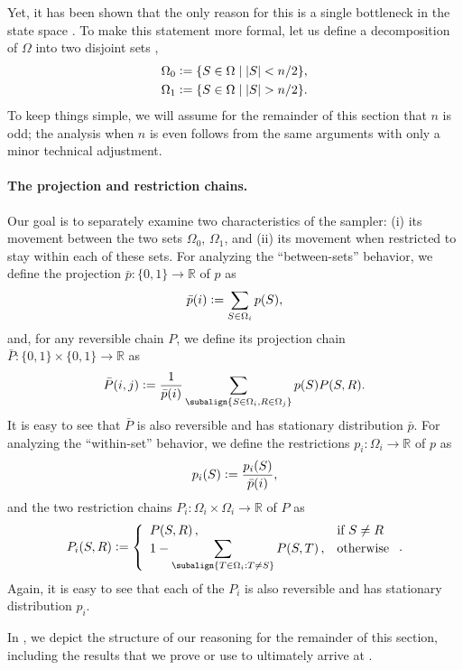 Yet, it has been shown that the only reason for this is a single bottleneck in the state space \citep{levin08}.
To make this statement more formal, let us define a decomposition of $\Omega$ into two disjoint sets \citep{jerrum04poincare},
\begin{align*}
\Omega_0 &\vcentcolon= \{S \in \Omega \mid |S| < n/2\},\\
\Omega_1 &\vcentcolon= \{S \in \Omega \mid |S| > n/2\}.
\end{align*}
To keep things simple, we will assume for the remainder of this section that $n$ is odd; the analysis when $n$ is even follows from the same arguments with only a minor technical adjustment.

\paragraph{The projection and restriction chains.}
Our goal is to separately examine two characteristics of the sampler: (i) its movement between the two sets $\Omega_0$, $\Omega_1$, and (ii) its movement when restricted to stay within each of these sets.
For analyzing the ``between-sets'' behavior, we define the projection $\bar{p} : \{0, 1\} \to \mathbb{R}$ of $p$ as
\begin{align*}
  \bar{p}(i) \vcentcolon= \sum_{S \in \Omega_i} p(S),
\end{align*}
and, for any reversible chain $P$, we define its projection chain $\bar{P} : \{0, 1\} \times \{0, 1\} \to \mathbb{R}$ as
\begin{align*}
  \bar{P}(i, j) \defeq \frac{1}{\bar{p}(i)} \sum_{\subalign{S \in \Omega_i, R \in \Omega_j}} p(S) P(S, R).
\end{align*}
It is easy to see that $\bar{P}$ is also reversible and has stationary distribution $\bar{p}$. For analyzing the ``within-set'' behavior, we define the restrictions $p_i : \Omega_i \to \mathbb{R}$ of $p$ as
\begin{align*}
  p_i(S) \vcentcolon= \frac{p_i(S)}{\bar{p}(i)},
\end{align*}
and the two restriction chains $P_i : \Omega_i \times \Omega_i \to \mathbb{R}$ of $P$ as
\begin{align*}
  P_i(S, R) \defeq \twopartdefo{P(S, R)}{S \neq R}{1 - \displaystyle\sum_{\subalign{T \in \Omega_i: T \neq S}}P(S, T)}.
\end{align*}
Again, it is easy to see that each of the $P_i$ is also reversible and has stationary distribution $p_i$.

In , we depict the structure of our reasoning for the remainder of this section, including the results that we prove or use to ultimately arrive at .

